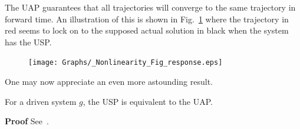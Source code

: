 The UAP guarantees that all trajectories will converge to the same trajectory in forward time. 
An illustration of this is shown in Fig.~\ref{fig:memloss_conttime} where the trajectory in red seems to lock on to the supposed actual solution in black when the system has the USP.

\begin{figure}[ht]
  \texttt{[image: Graphs/\_Nonlinearity\_Fig\_response.eps]}
  \centering
{} 
\label{fig:memloss_conttime} 
\end{figure} 

One may now appreciate an even more astounding result.

\begin{Theorem}
  For a driven system $g$, the USP is equivalent to the UAP. 
\end{Theorem}
\vspace{-6mm}
{\bf Proof} See~\cite{Manju_Nonlinearity}.  




